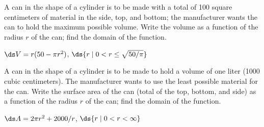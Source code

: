 \begin{exercises}
\begin{exercise} A can in the shape of a cylinder is to be made with a total
of 100 square centimeters of material in the side, top, and bottom;
the manufacturer wants the can to hold the maximum possible
volume. Write the volume as a function of the radius $r$ of the can;
find the domain of the function.
\begin{answer} $\ds V=r(50-\pi r^2)$, $\ds \{r\mid 0< r\le \sqrt{50/\pi}\}$
\end{answer}\end{exercise}

\begin{exercise} A can in the shape of a cylinder is to be made to hold a
volume of one liter (1000 cubic centimeters). The manufacturer wants
to use the least possible material for the can. Write the surface area
of the can (total of the top, bottom, and side) as a function of the
radius $r$ of the can; find the domain of the function.
\begin{answer} $\ds A=2\pi r^2+2000/r$, $\ds \{r\mid 0<r<\infty\}$
\end{answer}\end{exercise}

\end{exercises}

